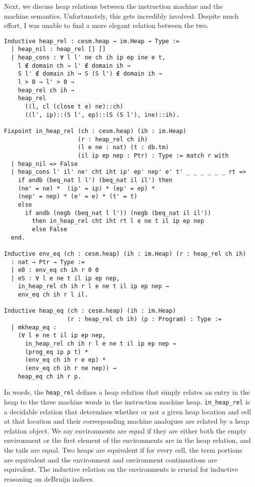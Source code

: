 Next, we discuss heap relations between the instruction machine and the \ce \\
machine semantics. Unfortunately, this gets incredibly involved. Despite much
effort, I was unable to find a more elegant relation between the two.

\begin{verbatim}
Inductive heap_rel : cesm.heap → im.Heap → Type := 
  | heap_nil : heap_rel [] [] 
  | heap_cons : ∀ l l' ne ch ih ip ep ine e t, 
    l ∉ domain ch → l' ∉ domain ih → 
    S l' ∉ domain ih → S (S l') ∉ domain ih →
    l > 0 → l' > 0 → 
    heap_rel ch ih → 
    heap_rel 
      ((l, cl (close t e) ne)::ch) 
      ((l', ip)::(S l', ep)::(S (S l'), ine)::ih).

Fixpoint in_heap_rel (ch : cesm.heap) (ih : im.Heap)
                     (r : heap_rel ch ih)
                     (l e ne : nat) (t : db.tm) 
                     (il ip ep nep : Ptr) : Type := match r with
  | heap_nil => False
  | heap_cons l' il' ne' cht iht ip' ep' nep' e' t' _ _ _ _ _ _ rt => 
    if andb (beq_nat l l') (beq_nat il il') then
    (ne' = ne) *  (ip' = ip) * (ep' = ep) * 
    (nep' = nep) * (e' = e) * (t' = t)
    else 
      if andb (negb (beq_nat l l')) (negb (beq_nat il il'))
        then in_heap_rel cht iht rt l e ne t il ip ep nep
        else False
  end.

Inductive env_eq (ch : cesm.heap) (ih : im.Heap) (r : heap_rel ch ih)
  : nat → Ptr → Type :=
  | e0 : env_eq ch ih r 0 0 
  | eS : ∀ l e ne t il ip ep nep, 
    in_heap_rel ch ih r l e ne t il ip ep nep →
    env_eq ch ih r l il.

Inductive heap_eq (ch : cesm.heap) (ih : im.Heap) 
                  (r : heap_rel ch ih) (p : Program) : Type := 
  | mkheap_eq : 
    (∀ l e ne t il ip ep nep, 
      in_heap_rel ch ih r l e ne t il ip ep nep →
      (prog_eq ip p t) * 
      (env_eq ch ih r e ep) * 
      (env_eq ch ih r ne nep)) → 
    heap_eq ch ih r p.

\end{verbatim}

In words, the \texttt{heap\_rel} defines a heap relation that simply relates an
entry in the \ce heap to the three machine words in the instruction machine
heap. \texttt{in\_heap\_rel} is a decidable relation that determines whether or
not a given heap location and cell at that location and their corresponding
machine analogues are related by a heap relation object. We say environments are
equal if they are either both the empty environment or the first element of the
environments are in the heap relation, and the tails are equal. Two heaps are
equivalent if for every cell, the term portions are equivalent and the
environment and environment continuations are equivalent. The inductive relation
on the environments is crucial for inductive reasoning on deBruijn indices.

